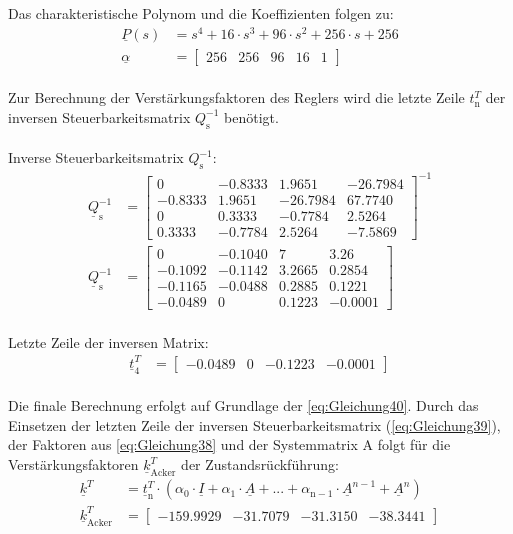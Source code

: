 \documentclass[
	pagesize,
	fontsize=12pt,
	paper=a4,
	oneside,
   reqno
]{scrartcl}
\begin{document}
Das charakteristische Polynom und die Koeffizienten folgen zu:
\begin{align}
    \underline{P}(s) &= s^4+16\cdot s^3+96\cdot s^2+256\cdot s+256 \nonumber \\
    \underline{\alpha} &=
    \begin{bmatrix}
        256 & 256 & 96 & 16 & 1
    \end{bmatrix} \label{eq:Gleichung38}
\end{align}\\
Zur Berechnung der Verstärkungsfaktoren des Reglers wird die letzte Zeile $t_{\mathrm{n}}^T$ der inversen Steuerbarkeitsmatrix $Q_{\mathrm{s}}^{-1}$ benötigt.\\\\
Inverse Steuerbarkeitsmatrix $Q_{\mathrm{s}}^{-1}$:
\begin{align*}
    \underline{Q}_{\mathrm{s}}^{-1} &=
    \begin{bmatrix}
         0 & -0.8333 & 1.9651 & -26.7984 \\
        -0.8333 & 1.9651 & -26.7984 & 67.7740 \\
        0 & 0.3333 & -0.7784 & 2.5264 \\
        0.3333 & -0.7784 & 2.5264 & -7.5869
    \end{bmatrix}^{-1} \\
    \underline{Q}_{\mathrm{s}}^{-1} &=
    \begin{bmatrix}
        0 & -0.1040 & 7 & 3.26 \\
        -0.1092 & -0.1142 & 3.2665 & 0.2854 \\
        -0.1165 & -0.0488 & 0.2885 & 0.1221 \\
        -0.0489 & 0 & 0.1223 & -0.0001
    \end{bmatrix}
\end{align*}\\
Letzte Zeile der inversen Matrix:
\begin{align} \label{eq:Gleichung39}
    \underline{t}_{\mathrm{4}}^T &=
    \begin{bmatrix}
        -0.0489 & 0 & -0.1223 & -0.0001
    \end{bmatrix}
\end{align}\\
Die finale Berechnung erfolgt auf Grundlage der \autoref{eq:Gleichung40}. Durch das Einsetzen der letzten Zeile der inversen Steuerbarkeitsmatrix (\autoref{eq:Gleichung39}), der Faktoren aus \autoref{eq:Gleichung38} und der Systemmatrix A folgt für die Verstärkungsfaktoren $\underline{k}^T_{\mathrm{Acker}}$ der Zustandsrückführung:
\begin{align}
    \underline{k}^T &= \underline{t}_{\mathrm{n}}^T\cdot(\alpha_{\mathrm{0}}\cdot\underline{I} + \alpha_{\mathrm{1}}\cdot \underline{A} + ... + \alpha_{\mathrm{n-1}}\cdot \underline{A}^{n-1}+\underline{A}^n) \label{eq:Gleichung40}\\
    \underline{k}^T_{\mathrm{Acker}} &=
    \begin{bmatrix}
        -159.9929 & -31.7079 & -31.3150 & -38.3441
    \end{bmatrix} \label{eq:Gleichung41}
\end{align}
\end{document}
